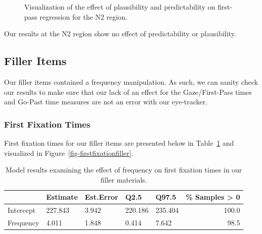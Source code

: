 \documentclass[
  letterpaper,
  DIV=11,
  numbers=noendperiod,
  nottoc]{scrreprt}
\begin{document}
\begin{figure}[htbp]


\caption{\label{fig-firstpassn2}Visualization of the effect of
plausibility and predictability on first-pass regression for the N2
region.}

\end{figure}%

Our results at the N2 region show no effect of predictability or
plausibility.

\subsection{Filler Items}\label{filler-items}

Our filler items contained a frequency manipulation. As such, we can
sanity check our results to make sure that our lack of an effect for the
Gaze/First-Pass times and Go-Past time measures are not an error with
our eye-tracker.

\subsubsection{First Fixation Times}\label{first-fixation-times-1}

First fixation times for our filler items are presented below in
Table~\ref{tbl-firstfixationfiller} and visualized in
Figure~\ref{fig-firstfixationfiller}.

\begin{longtable}[]{@{}lllllr@{}}

\caption{\label{tbl-firstfixationfiller}Model results examining the
effect of frequency on first fixation times in our filler materials.}

\tabularnewline

\toprule\noalign{}
& Estimate & Est.Error & Q2.5 & Q97.5 & \% Samples \textgreater{} 0 \\
\midrule\noalign{}
\endhead
\bottomrule\noalign{}
\endlastfoot
Intercept & 227.843 & 3.942 & 220.186 & 235.404 & 100.0 \\
Frequency & 4.011 & 1.848 & 0.414 & 7.642 & 98.5 \\

\end{longtable}
\end{document}
